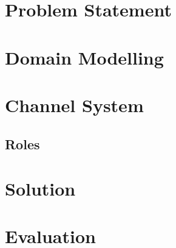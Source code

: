 \section {Problem Statement}
\label{sec:problem}


\section{Domain Modelling}
\label{sec:modelling}


\section{Channel System}
\label{sec:modelling}


\subsection{Roles}
\label{sec:roles}


\section{Solution}
\label{sec:solution}



%


\section{Evaluation}%
\label{sec:validation}



%
